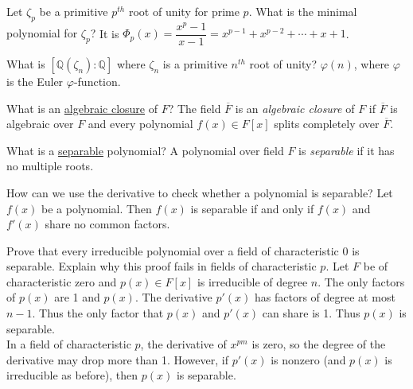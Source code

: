 \documentclass[avery5371,grid]{flashcards}
\newcommand{\Q}{\mathbb{Q}}
\let \phi \varphi
\begin{document}
\begin{flashcard}[Fields]{Let $\zeta_p$ be a primitive $p^{th}$ root of unity for prime $p$. What is the minimal polynomial for $\zeta_p$?}
 It is $\Phi_p(x) = \dfrac{x^p - 1}{x - 1} = x^{p-1} + x^{p-2} + \cdots + x + 1$.
\end{flashcard}

\begin{flashcard}[Fields]{What is $[\Q(\zeta_n):\Q]$ where $\zeta_n$ is a primitive $n^{th}$ root of unity?}
 $\phi(n)$, where $\phi$ is the Euler $\phi$-function.
\end{flashcard}

\begin{flashcard}[Fields]{What is an \underline{algebraic closure} of $F$?}
 The field $\overline{F}$ is an \emph{algebraic closure} of $F$ if $\overline{F}$ is algebraic over $F$ and every polynomial $f(x) \in F[x]$ splits completely over $\overline{F}$.
\end{flashcard}

\begin{flashcard}[Fields]{What is a \underline{separable} polynomial?}
 A polynomial over field $F$ is \emph{separable} if it has no multiple roots.
\end{flashcard}

\begin{flashcard}[Fields]{How can we use the derivative to check whether a polynomial is separable?}
 Let $f(x)$ be a polynomial. Then $f(x)$ is separable if and only if $f(x)$ and $f'(x)$ share no common factors.
\end{flashcard}

\begin{flashcard}[Fields]{Prove that every irreducible polynomial over a field of characteristic 0 is separable. Explain why this proof fails in fields of characteristic $p$.}
 Let $F$ be of characteristic zero and $p(x) \in F[x]$ is irreducible of degree $n$. The only factors of $p(x)$ are 1 and $p(x)$. The derivative $p'(x)$  has factors of degree at most $n-1$. Thus the only factor that $p(x)$ and $p'(x)$ can share is 1. Thus $p(x)$ is separable.\\
 
 In a field of characteristic $p$, the derivative of $x^{pm}$ is zero, so the degree of the derivative may drop more than 1. However, if $p'(x)$ is nonzero (and $p(x)$ is irreducible as before), then $p(x)$ is separable.
\end{flashcard}
\end{document}
